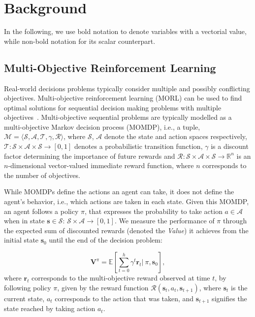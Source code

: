\documentclass{article}
\renewcommand{\cite}[1]{\citep{#1}}
\newcommand{\mdpstatespace}{\mathcal{S}}
\newcommand{\mdpactionspace}{\mathcal{A}}
\newcommand{\mdpdiscount}{\gamma}
\newcommand{\mdppolicy}{\pi}
\newcommand{\momdpvaluefunction}{\mathbf{V}}
\newcommand{\mdptransition}{\mathcal{T}}
\newcommand{\mdprewardfn}{\mathcal{R}}
\newcommand{\momdprewardfn}{\bm{\mathcal{R}}}
\newcommand{\mdpstate}{\mathbf{s}}
\newcommand{\momdpreward}{\mathbf{r}}
\newcommand{\action}{a}
\newcommand{\ltuple}{\langle}
\newcommand{\rtuple}{\rangle}
\begin{document}
\section{Background}
In the following, we use bold notation to denote variables with a vectorial value, while non-bold notation for its scalar counterpart.

\subsection{Multi-Objective Reinforcement Learning}
Real-world decisions problems typically consider multiple and possibly conflicting objectives. Multi-objective reinforcement learning (MORL) can be used to find optimal solutions for sequential decision making problems with multiple objectives~\cite{hayes2021practical}. Multi-objective sequential problems are typically modelled as a multi-objective Markov decision process (MOMDP), i.e., a tuple, $\mathcal{M} = \ltuple\mdpstatespace, \mdpactionspace, \mdptransition, \mdpdiscount, \momdprewardfn\rtuple$, where $\mdpstatespace$, $\mdpactionspace$ denote the state and action spaces respectively, $\mdptransition \colon \mdpstatespace \times \mdpactionspace \times \mdpstatespace  \to \left[ 0, 1 \right]$ denotes a probabilistic transition function, $\mdpdiscount$ is a discount factor determining the importance of future rewards and $\momdprewardfn \colon \mdpstatespace \times \mdpactionspace \times \mdpstatespace \to \mathbb{R}^n$ is an $n$-dimensional vector-valued immediate reward function, where $n$ corresponds to the number of objectives. 

While MOMDPs define the actions an agent can take, it does not define the agent's behavior, i.e., which actions are taken in each state. Given this MOMDP, an agent follows a policy $\mdppolicy$, that expresses the probability to take action $\action \in \mdpactionspace$ when in state $\mdpstate \in \mdpstatespace$: $\mdpstatespace \times \mdpactionspace \to \left[ 0, 1 \right]$. We measure the performance of $\mdppolicy$ through the expected sum of discounted rewards (denoted the \emph{Value}) it achieves from the initial state $\mdpstate_0$ until the end of the decision problem:

\begin{equation}
    \momdpvaluefunction^\mdppolicy = \mathbb{E} \left [ \sum_{t=0}^h \mdpdiscount^t \momdpreward_t |\ \mdppolicy, \mdpstate_0 \right ],
\end{equation}
%
where $\momdpreward_t$ corresponds to the multi-objective reward observed at time $t$, by following policy $\mdppolicy$, given by the reward function $\mdprewardfn(\mdpstate_t, \action_t, \mdpstate_{t+1})$, where $\mdpstate_t$ is the current state, $\action_t$ corresponds to the action that was taken, and $\mdpstate_{t+1}$ signifies the state reached by taking action $\action_t$.
\end{document}
